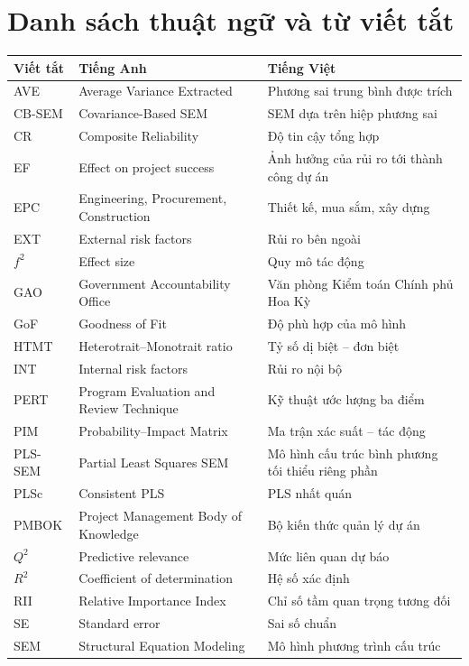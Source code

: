 \chapter*{Danh sách thuật ngữ và từ viết tắt}

\begin{longtable}{@{}L{2.2cm}L{5.6cm}L{6.2cm}@{}}
\toprule
\textbf{Viết tắt} & \textbf{Tiếng Anh} & \textbf{Tiếng Việt} \\
\midrule
\endhead
AVE & Average Variance Extracted & Phương sai trung bình được trích \\
CB-SEM & Covariance-Based SEM & SEM dựa trên hiệp phương sai \\
CR & Composite Reliability & Độ tin cậy tổng hợp \\
EF & Effect on project success & Ảnh hưởng của rủi ro tới thành công dự án \\
EPC & Engineering, Procurement, Construction & Thiết kế, mua sắm, xây dựng \\
EXT & External risk factors & Rủi ro bên ngoài \\
$f^2$ & Effect size & Quy mô tác động \\
GAO & Government Accountability Office & Văn phòng Kiểm toán Chính phủ Hoa Kỳ \\
GoF & Goodness of Fit & Độ phù hợp của mô hình \\
HTMT & Heterotrait--Monotrait ratio & Tỷ số dị biệt -- đơn biệt \\
INT & Internal risk factors & Rủi ro nội bộ \\
PERT & Program Evaluation and Review Technique & Kỹ thuật ước lượng ba điểm \\
PIM & Probability--Impact Matrix & Ma trận xác suất -- tác động \\
PLS-SEM & Partial Least Squares SEM & Mô hình cấu trúc bình phương tối thiểu riêng phần \\
PLSc & Consistent PLS & PLS nhất quán \\
PMBOK & Project Management Body of Knowledge & Bộ kiến thức quản lý dự án \\
$Q^2$ & Predictive relevance & Mức liên quan dự báo \\
$R^2$ & Coefficient of determination & Hệ số xác định \\
RII & Relative Importance Index & Chỉ số tầm quan trọng tương đối \\
SE & Standard error & Sai số chuẩn \\
SEM & Structural Equation Modeling & Mô hình phương trình cấu trúc \\

\end{longtable}
